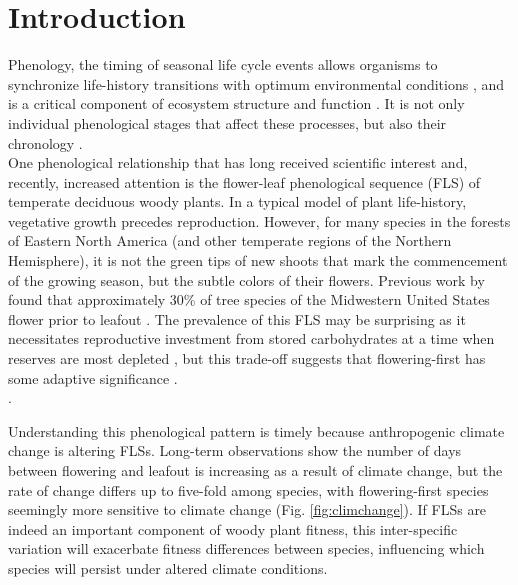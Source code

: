 \documentclass[11pt]{article}
\begin{document}
\section*{Introduction}
Phenology, the timing of seasonal life cycle events allows organisms to synchronize life-history transitions with optimum environmental conditions \citep{Forrest2010}, and is a critical component of ecosystem structure and function \citep{Cleland2007,Piao2007}. It is not only individual phenological stages that affect these processes, but also their chronology \citep{Firmat2017,Vitasse2010,Ettinger2018}.\\

\noindent One phenological relationship that has long received scientific interest \citep[see][]{Robertson1895} and, recently, increased attention \citep[e.g.][]{Savage2019, Gougherty2018} is the flower-leaf phenological sequence (FLS) of temperate deciduous woody plants. In a typical model of plant life-history, vegetative growth precedes reproduction. However, for many species in the forests of Eastern North America (and other temperate regions of the Northern Hemisphere), it is not the green tips of new shoots that mark the commencement of the growing season, but the subtle colors of their flowers. Previous work by \citet{Gougherty2018} found that approximately 30\% of tree species of the Midwestern United States flower prior to leafout . The prevalence of this FLS may be surprising as it necessitates reproductive investment from stored carbohydrates at a time when reserves are most depleted \citep{Primack1987} , but this trade-off suggests that flowering-first has some adaptive significance \citep{Rathcke_1985}.\\  .

\noindent Understanding this phenological pattern is timely because anthropogenic climate change is altering FLSs. Long-term observations show the number of days between flowering and leafout is increasing as a result of climate change, but the rate of change differs up to five-fold among species, with flowering-first species seemingly more sensitive  to climate change (Fig. \ref{fig:climchange}).  If FLSs are indeed an important component of woody plant fitness, this inter-specific variation will exacerbate fitness differences between species, influencing which species will persist under altered climate conditions.\\ 
\end{document}
